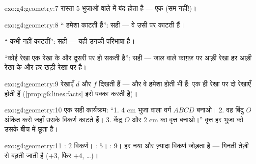 \begin{solution}{exo:g4:geometry:7}
रास्ता $5$ भुजाओं वाले  में बंद होता है --- एक 
(सम नहीं!)।
\end{solution}

\begin{solution}{exo:g4:geometry:8}
`` हमेशा काटती हैं'': सही --- वे उसी
 पर काटती हैं।

`` कभी नहीं काटतीं'': सही --- यही उनकी परिभाषा है।

``कोई रेखा एक रेखा के  और दूसरी पर  हो सकती
है'': सही --- जाल वाले काग़ज़ पर आड़ी रेखा हर आड़ी रेखा के
 और हर खड़ी रेखा पर  है।
\end{solution}

\begin{solution}{exo:g4:geometry:9}
रेखाएँ $d$ और $f$  दिखती हैं --- और वे हमेशा होती भी हैं:
एक ही रेखा पर  दो रेखाएँ  होती हैं
(\cref{prop:g6:lines:facts} इसे पक्का करती है)।
\end{solution}

\begin{solution}{exo:g4:geometry:10}
एक सही कार्यक्रम: ``1. $4$ cm भुजा वाला वर्ग $ABCD$ बनाओ।
2. वह बिंदु $O$ अंकित करो जहाँ उसके विकर्ण काटते हैं। 3. केंद्र
$O$ और  $2$ cm का वृत्त बनाओ।'' वृत्त हर भुजा को उसके
बीच में छूता है।
\end{solution}

\begin{solution}{exo:g4:geometry:11}
: $2$ विकर्ण। : $5$। : $9$। हर नया
 और ज़्यादा विकर्ण जोड़ता है --- गिनती तेज़ी से बढ़ती जाती
है ($+3$, फिर $+4$, \dots)।
\end{solution}
